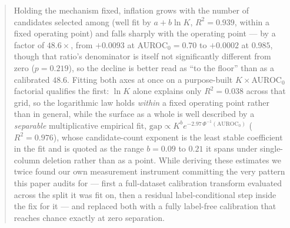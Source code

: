 \documentclass[10pt]{article} %
\begin{document}
\begin{abstract}
Holding the mechanism fixed, inflation grows with the number of candidates
selected among (well fit by $a+b\ln K$, $R^2=0.939$, within a fixed operating
point) and falls sharply with the operating point --- by a factor of
$48.6\times$, from $+0.0093$ at AUROC$_0=0.70$ to $+0.0002$ at $0.985$, though
that ratio's denominator is itself not significantly different from zero
($p=0.219$), so the decline is better read as ``to the floor'' than as a
calibrated $48.6$.
Fitting both axes at once on a purpose-built $K\times$AUROC$_0$ factorial
qualifies the first: $\ln K$ alone explains only $R^2=0.038$ across that
grid, so the logarithmic law holds \emph{within} a fixed operating point
rather than in general, while the surface as a whole is well described by a
\emph{separable} multiplicative empirical fit, $\text{gap}\propto
K^{b}e^{-2.97\,\Phi^{-1}(\text{AUROC}_0)}$ ($R^2=0.976$), whose candidate-count
exponent is the least stable coefficient in the fit and is quoted as the range
$b=0.09$ to $0.21$ it spans under single-column deletion rather than as a
point. While deriving
these estimates we twice found our own measurement instrument committing the
very pattern this paper audits for --- first a full-dataset calibration
transform evaluated across the split it was fit on, then a residual
label-conditional step inside the fix for it --- and replaced both with a
fully label-free calibration that reaches chance exactly at zero separation.


\end{abstract}
\end{document}
